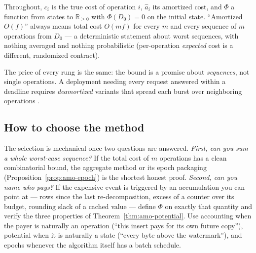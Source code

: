 \begin{remarkbox}[Notation]
Throughout, $c_i$ is the true cost of operation $i$, $\hat{a}_i$ its amortized
cost, and $\Phi$ a function from states to $\mathbb{R}_{\ge 0}$ with
$\Phi(D_0) = 0$ on the initial state. ``Amortized $O(f)$'' always means
total cost $O(mf)$ for every $m$ and every sequence of $m$ operations from
$D_0$ --- a deterministic statement about worst sequences, with nothing
averaged and nothing probabilistic (per-operation \emph{expected} cost is a
different, randomized contract).
\end{remarkbox}

The price of every rung is the same: the bound is a promise about
\emph{sequences}, not single operations. A deployment needing every request
answered within a deadline requires \emph{deamortized} variants that spread
each burst over neighboring operations \citep{amortized-potential-bg5}.

\subsection{How to choose the method}
\label{sec:amo-choose}

The selection is mechanical once two questions are answered. \emph{First, can
you sum a whole worst-case sequence?} If the total cost of $m$ operations has
a clean combinatorial bound, the aggregate method or its epoch packaging
(Proposition~\ref{prop:amo-epoch}) is the shortest honest proof.
\emph{Second, can you name who pays?} If the expensive event is triggered by
an accumulation you can point at --- rows since the last re-decomposition,
excess of a counter over its budget, rounding slack of a cached value ---
define $\Phi$ on exactly that quantity and verify the three properties of
Theorem~\ref{thm:amo-potential}. Use accounting when the payer is naturally
an operation (``this insert pays for its own future copy''), potential when
it is naturally a state (``every byte above the watermark''), and epochs
whenever the algorithm itself has a batch schedule.

